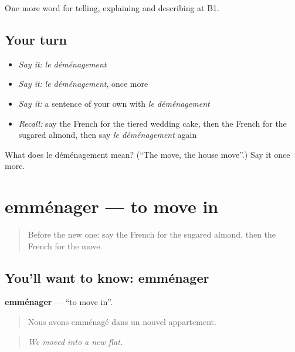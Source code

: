 \begin{grammarlens}[title={What you've built}]
One more word for telling, explaining and describing at B1.
\end{grammarlens}

\subsection*{Your turn}
\begin{itemize}
\raggedright
  \item \emph{Say it:} \emph{le déménagement}
  \item \emph{Say it:} \emph{le déménagement}, once more
  \item \emph{Say it:} a sentence of your own with \emph{le déménagement}
  \item \emph{Recall:} say the French for the tiered wedding cake, then the French for the sugared almond, then say \emph{le déménagement} again
\end{itemize}

\begin{tcolorbox}[breakable,colback=teal!4,colframe=teal!35!black,title={Before you move on}]
What does le déménagement mean? (\textquotedblleft{}The move, the house move\textquotedblright{}.) Say it once more.
\end{tcolorbox}
\section[emménager]{emménager — to move in}

\label{lesson:FR-C312-emmenager}



\begin{quote}
Before the new one: say the French for the sugared almond, then the French for the move.
\end{quote}

\subsection*{You'll want to know: emménager}
\textbf{emménager} — \textquotedblleft{}to move in\textquotedblright{}.

\begin{quote}
Nous avons emménagé dans un nouvel appartement.
\end{quote}

\begin{quote}
\emph{We moved into a new flat.}
\end{quote}

